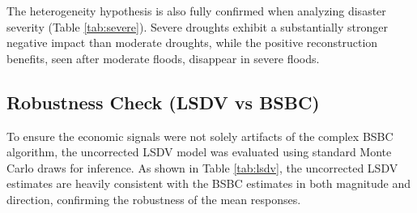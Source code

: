 \documentclass[11pt, a4paper]{article}
\begin{document}
\begin{table}[H]
    \centering
    \caption{Mean responses of GDP growth to moderate vs. severe disaster shocks (BSBC)}
    \label{tab:severe}
    \renewcommand{\arraystretch}{0.95} 
\end{table}

The heterogeneity hypothesis is also fully confirmed when analyzing disaster severity (Table \ref{tab:severe}). Severe droughts exhibit a substantially stronger negative impact than moderate droughts, while the positive reconstruction benefits, seen after moderate floods, disappear in severe floods.

\subsection{Robustness Check (LSDV vs BSBC)}
To ensure the economic signals were not solely artifacts of the complex BSBC algorithm, the uncorrected LSDV model was evaluated using standard Monte Carlo draws for inference. As shown in Table \ref{tab:lsdv}, the uncorrected LSDV estimates are heavily consistent with the BSBC estimates in both magnitude and direction, confirming the robustness of the mean responses.
\end{document}
